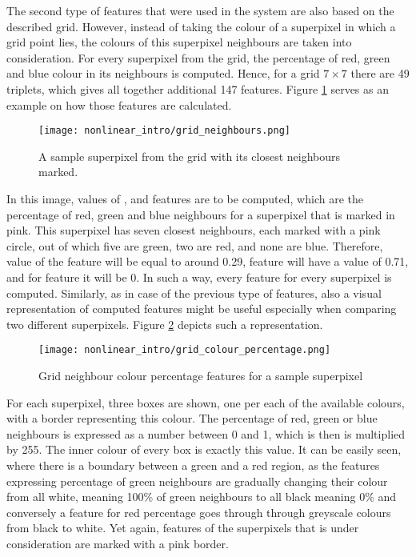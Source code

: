 The second type of features that were used in the system are also based on the described grid. However, instead of taking the colour of a superpixel in which a grid point lies, the colours of this superpixel neighbours are taken into consideration. For every superpixel from the grid, the percentage of red, green and blue colour in its neighbours is computed. Hence, for a grid $7 \times 7$ there are 49 triplets, which gives all together additional 147 features. Figure \ref{fig:grid_colour_neighbour} serves as an example on how those features are calculated.
\begin{figure}[ht]
    \centering
    \texttt{[image: nonlinear\_intro/grid\_neighbours.png]}
    \caption{A sample superpixel from the grid with its closest neighbours marked.}
    \label{fig:grid_colour_neighbour}
\end{figure}
In this image, values of ,  and  features are to be computed, which are the percentage of red, green and blue neighbours for a superpixel that is marked in pink. This superpixel has seven closest neighbours, each marked with a pink circle, out of which five are green, two are red, and none are blue. Therefore, value of the  feature will be equal to around 0.29,  feature will have a value of 0.71, and for  feature it will be 0. In such a way, every feature for every superpixel is computed. Similarly, as in case of the previous type of features, also a visual representation of computed features might be useful especially when comparing two different superpixels. Figure \ref{fig:grid_colour_neighbour_percentage} depicts such a representation. 
\begin{figure}[ht]
    \centering
    \texttt{[image: nonlinear\_intro/grid\_colour\_percentage.png]}
    \caption{Grid neighbour colour percentage features for a sample superpixel}
    \label{fig:grid_colour_neighbour_percentage}
\end{figure}
For each superpixel, three boxes are shown, one per each of the available colours, with a border representing this colour. The percentage of red, green or blue neighbours is expressed as a number between 0 and 1, which is then is multiplied by 255. The inner colour of every box is exactly this value. It can be easily seen, where there is a boundary between a green and a red region, as the features expressing percentage of green neighbours are gradually changing their colour from all white, meaning 100\% of green neighbours to all black meaning 0\% and conversely a feature for red percentage goes through through greyscale colours from black to white. Yet again, features of the superpixels that is under consideration are marked with a pink border.

